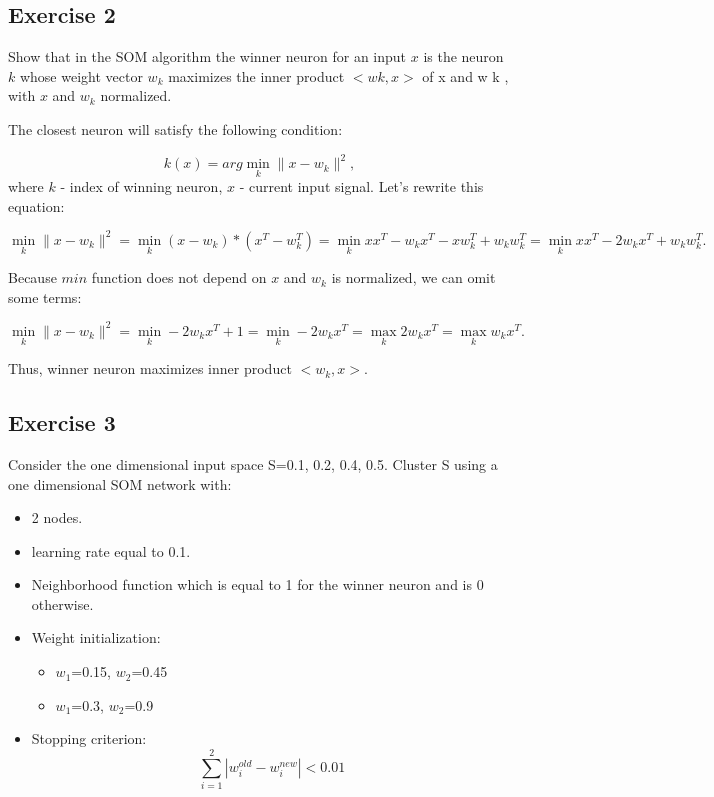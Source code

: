 \documentclass[a4paper, 12pt]{article}
\begin{document}
\subsection{Exercise 2}
Show that in the SOM algorithm the winner neuron for an input $x$ is the neuron $k$ whose weight vector $w_k$ maximizes the inner product $< w k ,x >$ of x and w k , with $x$ and $w_k$ normalized.


The closest neuron will satisfy the following condition:

\begin{equation}
k(x) = arg \min\limits_k \parallel x-w_k \parallel^2,
\end{equation}
where $k$ - index of winning neuron, $x$ - current input signal. Let's rewrite this equation:

\begin{equation}
\min\limits_k \parallel x-w_k \parallel^2 = \min\limits_k (x-w_k)*(x^T-w_k^T) =  \min\limits_k x x^T-w_k x^T - x w_k^T + w_k w_k^T = \min\limits_k x x^T - 2  w_k x^T + w_k w_k^T.
\end{equation}

Because $min$ function does not depend on $x$ and $w_k$ is normalized, we can omit some terms:

\begin{equation}
\min\limits_k \parallel x-w_k \parallel^2 =\min\limits_k  - 2 w_k x^T + 1 = \min\limits_k  - 2 w_k x^T = \max\limits_k 2 w_k x^T = \max\limits_k w_k x^T.
\end{equation}

Thus, winner neuron maximizes inner product $<w_k,x>$.
\subsection{Exercise 3}

Consider the one dimensional input space S={0.1, 0.2, 0.4, 0.5}.
Cluster S using a one dimensional SOM network with:

\begin{itemize}
\item 2 nodes.
\item learning rate equal to 0.1.
\item Neighborhood function which is equal to 1 for the winner neuron and is 0 otherwise.
\item Weight initialization:
\begin{itemize}
\item $w_1$=0.15, $w_2$=0.45
\item $w_1$=0.3, $w_2$=0.9
\end{itemize}
\item Stopping criterion: $$\sum_{i=1}^2|w_i^{old} - w_i^{new}| < 0.01$$
\end{itemize}
\end{document}
